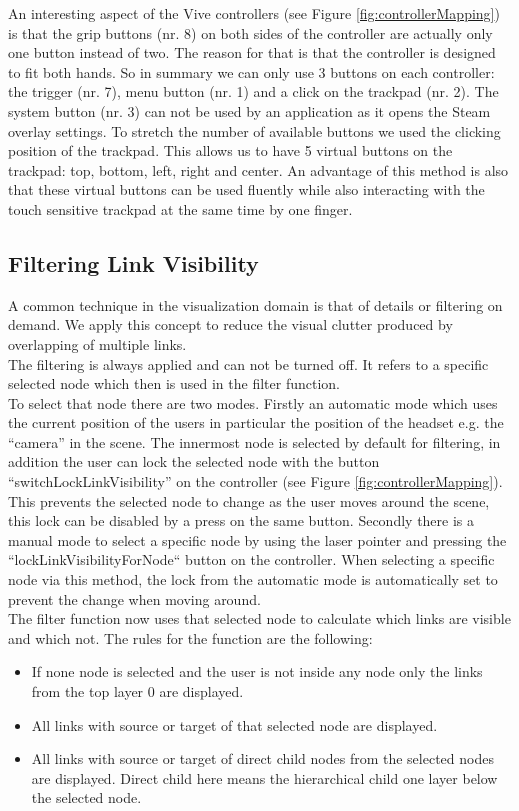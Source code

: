 An interesting aspect of the Vive controllers (see Figure \ref{fig:controllerMapping}) is that the grip buttons (nr. 8) on both sides of the controller are actually only one button instead of two. The reason for that is that the controller is designed to fit both hands. 
So in summary we can only use 3 buttons on each controller: the trigger (nr. 7), menu button (nr. 1) and a click on the trackpad (nr. 2). The system button (nr. 3) can not be used by an application as it opens the Steam overlay settings. To stretch the number of available buttons we used the clicking position of the trackpad. This allows us to have 5 virtual buttons on the trackpad: top, bottom, left, right and center. An advantage of this method is also that these virtual buttons can be used fluently while also interacting with the touch sensitive trackpad at the same time by one finger. 

\subsection{Filtering Link Visibility}
A common technique in the visualization domain is that of details or filtering on demand. We apply this concept to reduce the visual clutter produced by overlapping of multiple links.\\
The filtering is always applied and can not be turned off. It refers to a specific selected node which then is used in the filter function.\\
To select that node there are two modes. Firstly an automatic mode which uses the current position of the users in particular the position of the headset e.g. the “camera” in the scene. 
The innermost node is selected by default for filtering, in addition the user can lock the selected node with the button “switchLockLinkVisibility” on the controller (see Figure \ref{fig:controllerMapping}). This prevents the selected node to change as the user moves around the scene, this lock can be disabled by a press on the same button.
Secondly there is a manual mode to select a specific node by using the laser pointer and pressing the “lockLinkVisibilityForNode“ button on the controller. When selecting a specific node via this method, the lock from the automatic mode is automatically set to prevent the change when moving around.\\
The filter function now uses that selected node to calculate which links are visible and which not. The rules for the function are the following:
\begin{itemize}
    \item If none node is selected and the user is not inside any node only the links from the top layer 0 are displayed.
    \item All links with source or target of that selected node are displayed. 
    \item All links with source or target of direct child nodes from the selected nodes are displayed. Direct child here means the hierarchical child one layer below the selected node. 
\end{itemize}

